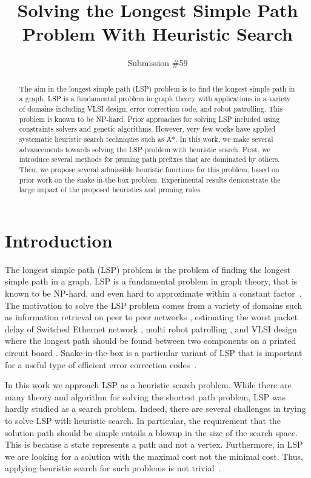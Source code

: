 \documentclass[letterpaper]{article} %
\title{Solving the Longest Simple Path Problem With Heuristic Search}
\author{Submission \#59}
\begin{document}
\maketitle

\begin{abstract}
The aim in the longest simple path (LSP) problem  is to find the longest simple path in a graph. LSP is a fundamental problem in graph theory with applications in a variety of domains including VLSI design, error correction code, and robot patrolling. This problem is known to be NP-hard. Prior approaches for solving LSP included using constraints solvers and genetic algorithms. However, very few works have applied systematic heuristic search techniques such as A*. In this work, we make several advancements towards solving the LSP problem with heuristic search.  First, we introduce several methods for pruning path prefixes that are dominated by others. Then, we propose several admissible heuristic functions for this problem, based on prior work on the snake-in-the-box problem. Experimental results demonstrate the large impact of the proposed heuristics and pruning rules.
\end{abstract}
\section{Introduction}

The longest simple path (LSP) problem is the problem of finding the longest simple path in a graph.
LSP is a fundamental problem in graph theory, that is known to be NP-hard, and even hard to approximate within a constant factor~\cite{karger1997approximating}. The motivation to solve the LSP problem comes from a variety of domains such as information retrieval on peer to peer networks \cite{Wong:2005:IRP:1062745.1062799}, estimating the worst packet delay of Switched Ethernet network \cite{DBLP:conf/sies/SchmidtS10}, multi robot patrolling \cite{Portugal:2010:MAM:1774088.1774360}, and VLSI design where the longest path should be found between two components on a printed circuit board \cite{chen2016vlsi}. Snake-in-the-box is a particular variant of LSP that is important for a useful type of efficient error correction codes~\cite{Kautz:1958:UDE}.




In this work we approach LSP as a heuristic search problem.
While there are many theory and algorithm for solving the shortest path problem, LSP was hardly studied as a search problem.
Indeed, there are several challenges in trying to solve LSP with heuristic search. In particular, the requirement that the solution path should be simple entails a blowup in the size of the search space. This is because a state represents a path and not a vertex.
Furthermore, in LSP we are looking for a solution with the maximal cost not the minimal cost. Thus, applying heuristic search for such problems is not trivial~\cite{DBLP:conf/socs/SternKPFR14}.
\end{document}
